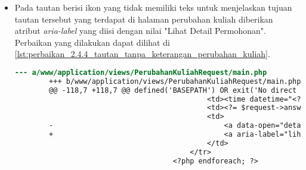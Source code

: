 \begin{itemize}
\begin{lstlisting}
                                                    <span aria-hidden="true">&times;</span>
                                                </button>
                                            </div>
        -                                    <a data-open="cetak<?= $request->id ?>"><i class="fi-print"></i></a>
        +                                    <a aria-label="cetak permohonan" data-open="cetak<?= $request->id ?>"><i class="fi-print"></i></a>
                                            <div class="reveal" id="hapus<?= $request->id ?>" data-reveal>
                                                <h5>Hapus Permohonan</h5>
                                                <form method="POST" action="/TranskripManage/remove">
        @@ -146,7 +146,7 @@ defined('BASEPATH') OR exit('No direct script access allowed');
                                                    <span aria-hidden="true">&times;</span>
                                                </button>
                                            </div>
        -                                    <a data-open="hapus<?= $request->id ?>"><i class="fi-trash"></i></a>
        +                                    <a aria-label="hapus permohonan" data-open="hapus<?= $request->id ?>"><i class="fi-trash"></i></a>
                                        </td>
                                    </tr>
                                <?php endforeach; ?>
    \end{lstlisting}

    \item Pada tautan berisi ikon yang tidak memiliki teks untuk menjelaskan tujuan tautan tersebut yang terdapat di halaman perubahan kuliah diberikan atribut \textit{aria-label} yang diisi dengan nilai "Lihat Detail Permohonan". Perbaikan yang dilakukan dapat dilihat di \ref{lst:perbaikan_2.4.4_tautan_tanpa_keterangan_perubahan_kuliah}.
    \begin{lstlisting}[frame=single, label={lst:perbaikan_2.4.4_tautan_tanpa_keterangan_perubahan_kuliah}, language=diff, caption=Perbaikan Kriteria Sukses 2.4.4 - Tautan Tanpa Keterangan di Halaman Perubahan Kuliah]
        --- a/www/application/views/PerubahanKuliahRequest/main.php
        +++ b/www/application/views/PerubahanKuliahRequest/main.php
        @@ -118,7 +118,7 @@ defined('BASEPATH') OR exit('No direct script access allowed');
                                             <td><time datetime="<?= $request->answeredDateTime ?>"><?= $request->answeredDateString ?></time></td>
                                             <td><?= $request->answeredMessage ?></td>
                                             <td>
        -                                        <a data-open="detail<?= $request->id ?>"><i class="fi-eye"></i></a>
        +                                        <a aria-label="lihat detail permohonan" data-open="detail<?= $request->id ?>"><i class="fi-eye"></i></a>
                                             </td>
                                         </tr>
                                     <?php endforeach; ?>        
    \end{lstlisting}


\end{itemize}
